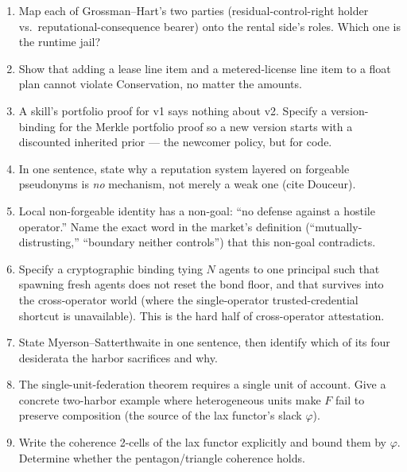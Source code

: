 \begin{enumerate}[label=\textbf{IV.\arabic*},leftmargin=2.8em,itemsep=6pt,topsep=4pt]
\item \wbcheck Map each of Grossman--Hart's two parties (residual-control-right
  holder vs.\ reputational-consequence bearer) onto the rental side's roles. Which
  one is the runtime jail?

\item \wbtrace Show that adding a lease line item and a metered-license line item to
  a float plan cannot violate Conservation, no matter the amounts.

\item \wbopen\wbstar A skill's portfolio proof for v1 says nothing about v2. Specify
  a version-binding for the Merkle portfolio proof so a new version starts with a
  discounted inherited prior --- the newcomer policy, but for code.

\item \wbcheck In one sentence, state why a reputation system layered on forgeable
  pseudonyms is \emph{no} mechanism, not merely a weak one (cite Douceur).

\item \wbcheck Local non-forgeable identity has a non-goal: ``no defense against a
  hostile operator.'' Name the exact word in the market's definition
  (``mutually-distrusting,'' ``boundary neither controls'') that this non-goal
  contradicts.

\item \wbopen\wbstar Specify a cryptographic binding tying $N$ agents to one
  principal such that spawning fresh agents does not reset the bond floor, and that
  survives into the cross-operator world (where the single-operator trusted-credential
  shortcut is unavailable). This is the hard half of cross-operator attestation.

\item \wbcheck State Myerson--Satterthwaite in one sentence, then identify which of
  its four desiderata the harbor sacrifices and why.

\item \wbtrace The single-unit-federation theorem requires a single unit of account.
  Give a concrete two-harbor example where heterogeneous units make $F$ fail to
  preserve composition (the source of the lax functor's slack $\varphi$).

\item \wbopen\wbstar Write the coherence 2-cells of the lax functor explicitly and
  bound them by $\varphi$. Determine whether the pentagon/triangle coherence holds.


\end{enumerate}
